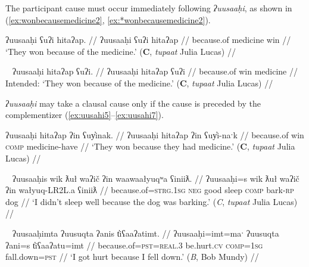 The participant cause must occur immediately following \textit{ʔuusaaḥi}, as shown in (\ref{ex:wonbecausemedicine2}, \ref{ex:*wonbecausemedicine2}).

\ex \label{ex:wonbecausemedicine2}
\begingl
\glpreamble ʔuusaaḥi ʕuʔi hitaʔap. //
\gla ʔuusaaḥi ʕuʔi hitaʔap //
\glb because.of medicine win //
\glft `They won because of the medicine.' (\textbf{C}, \textit{tupaat} Julia Lucas) //
\endgl
\xe

\ex~ \label{ex:*wonbecausemedicine2}
\begingl
\glpreamble *ʔuusaaḥi hitaʔap ʕuʔi. //
\gla ʔuusaaḥi hitaʔap ʕuʔi //
\glb because.of win medicine //
\glft Intended: `They won because of the medicine.' (\textbf{C}, \textit{tupaat} Julia Lucas) //
\endgl
\xe

\textit{ʔuusaaḥi} may take a clausal cause only if the cause is preceded by the complementizer (\ref{ex:uusahi5}--\ref{ex:uusahi7}).

\ex \label{ex:uusahi5}
\begingl
\glpreamble ʔuusaaḥi hitaʔap ʔin ʕuy̓inak. //
\gla ʔuusaaḥi hitaʔap ʔin ʕuy̓i-naˑk //
\glb because.of win \textsc{comp} medicine-have  //
\glft `They won because they had medicine.' (\textbf{C}, \textit{tupaat} Julia Lucas) //
\endgl
\xe

\ex~ \label{ex:uusahi6}
\begingl
\glpreamble ʔuusaaḥis wik ƛuł waʔič ʔin waawaałyuqʷa ʕiniiƛ. //
\gla ʔuusaaḥi=s wik ƛuł waʔič ʔin wałyuq-LR2L.a ʕiniiƛ //
\glb because.of=\textsc{strg.1sg} \textsc{neg} good sleep \textsc{comp} bark-\textsc{rp} dog  //
\glft `I didn't sleep well because the dog was barking.' (\textit{C}, \textit{tupaat} Julia Lucas) //
\endgl
\xe

\ex~ \label{ex:uusahi7}
\begingl
\glpreamble ʔuusaaḥimta ʔuusuqta ʔanis t̓iʕaaʔatimt. //
\gla ʔuusaaḥi=imt=maˑ ʔuusuqta ʔani=s t̓iʕaaʔatu=imt //
\glb because.of=\textsc{pst}=\textsc{real.3} be.hurt.\textsc{cv} \textsc{comp}=\textsc{1sg} fall.down=\textsc{pst}  //
\glft `I got hurt because I fell down.' (\textit{B}, Bob Mundy) //
\endgl
\xe

\begin{comment}
[[uusahi plus linker ]]
\textit{ʔuusaaḥi} may only be able to take the linker when it is non-initial. Both consultants with whom I attempted to add a linker to an ʔuusaaḥi-initial sentence were uncertain if it was okay or not but felt it was weird (\ref{ex:uusahi7}, \ref{ex:uusahi8}).

\ex \label{ex:uusahi7}
\begingl
\glpreamble ?? ʔuusaaḥiqḥita nay̓aqakʔi wikitaḥ ƛuł weʔič. //
\gla ʔuusaaḥi-(q)ḥ=(m)it=(m)aˑ nay̓aqak=ʔiˑ wik=(m)it=(m)aˑḥ ƛuł weʔič //
\glb because.of-\textsc{link}=\textsc{pst}=\textsc{real.3} baby=\textsc{art} \textsc{neg}=\textsc{pst}=\textsc{real.1sg} good sleep //
\glft Intended: `I didn't sleep well because of the baby.' (\textbf{B}, Bob Mundy) //
\endgl
\xe

*? ʔuusaaḥiqḥʔiš ʔuusaqta wik̓aałukʷint

ʔuusaqtumtʔiš ʔuusaaḥiqḥ wik̓aałukʷint
\end{comment}

